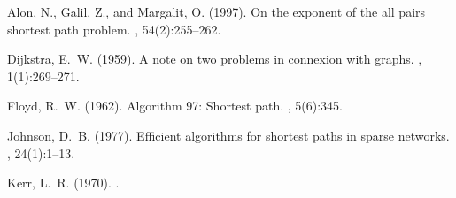 \documentclass[a4paper,10pt]{article}
\begin{document}
\begin{thebibliography}{}

Alon, N., Galil, Z., and Margalit, O. (1997).
\newblock On the exponent of the all pairs shortest path problem.
, 54(2):255--262.

Dijkstra, E.~W. (1959).
\newblock A note on two problems in connexion with graphs.
, 1(1):269--271.

Floyd, R.~W. (1962).
\newblock Algorithm 97: Shortest path.
, 5(6):345.

Johnson, D.~B. (1977).
\newblock Efficient algorithms for shortest paths in sparse networks.
, 24(1):1--13.

Kerr, L.~R. (1970).
.

\end{thebibliography}
\end{document}
